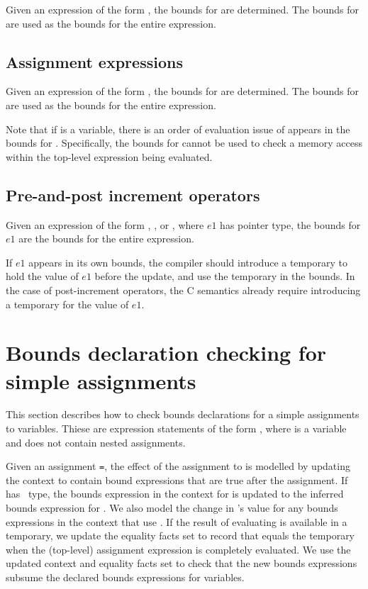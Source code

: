 Given an expression of the form  \code{,} , the
bounds for  are determined. The bounds for  are used
as the bounds for the entire expression.  

\subsection{Assignment expressions}

Given an expression of the form  \code{ = } , the
bounds for  are determined. The bounds for  are used
as the bounds for the entire expression.

Note that if  is a variable,
there is an order of evaluation issue of  appears in the bounds for
.   Specifically, the bounds for  cannot be used to
check a memory access within the top-level expression being evaluated.

\subsection{Pre-and-post increment operators}
\label{section:inferring-increment-bounds}

Given an expression of the form \code{++}, \code{--},
 \code{++} or \code{--}, where $e1$ has pointer type,
 the bounds for $e1$ are the bounds for the entire expression.
 
 If $e1$ appears in its own bounds, the compiler should introduce a
 temporary to hold the value of $e1$ before the update, and use
 the temporary in the bounds.  In the case of post-increment operators, 
 the C semantics already require  introducing a temporary for the value of $e1$.

\section{Bounds declaration checking for simple assignments}

This section describes how to check bounds declarations for a
simple assignments to variables.  Thiese are expression statements of the
form , where  is a variable and  does
not contain nested assignments.

Given an assignment \lstinline+=+, the effect of the assignment to 
is modelled by updating the context to contain bound expressions that are true
after the assignment.  If  has \arrayptr\ type, the bounds expression in
the context for  is updated to the inferred bounds expression for .
We also model the change in 's
value for any bounds expressions in the context that use .   If the result of 
evaluating  is available in a temporary, we update the equality facts set 
to record that  equals the temporary when the (top-level) assignment
expression is completely evaluated.
We use the updated context and equality facts set to check
that the new bounds expressions subsume the declared bounds expressions for variables.

